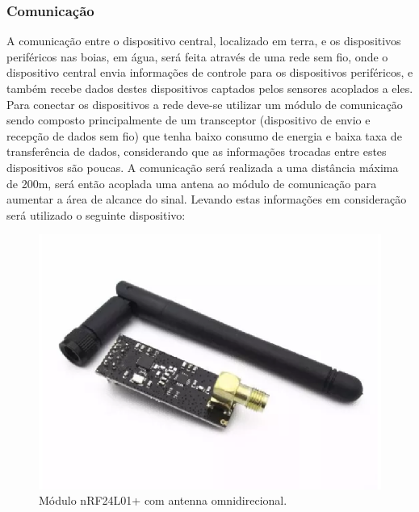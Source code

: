 \subsubsection{Comunicação}

A comunicação entre o dispositivo central, localizado em terra, e os dispositivos periféricos nas boias, em água, será feita através de uma rede sem fio, onde o dispositivo central envia informações de controle para os dispositivos periféricos, e também recebe dados destes dispositivos captados pelos sensores acoplados a eles. Para conectar os dispositivos a rede deve-se utilizar um módulo de comunicação sendo composto principalmente de um transceptor (dispositivo de envio e recepção de dados sem fio) que tenha baixo consumo de energia e baixa taxa de transferência de dados, considerando que as informações trocadas entre estes dispositivos são poucas. A comunicação será realizada a uma distância máxima de 200m, será então acoplada uma antena ao módulo de comunicação para aumentar a área de alcance do sinal. Levando estas informações em consideração será utilizado o seguinte dispositivo:


\begin{figure}[H]
 \centering
   \includegraphics[keepaspectratio=true,scale=0.8]{figuras/modulonrf2.eps}
 \caption{Módulo nRF24L01+ com antenna omnidirecional.}
 \label{nRF24}
\end{figure}

